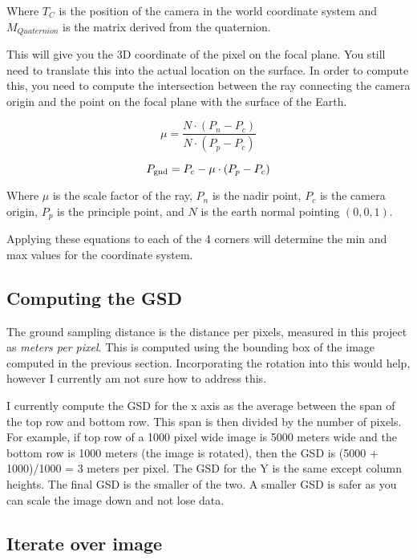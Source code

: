 Where $T_{C}$ is the position of the camera in the world coordinate system and
$M_{Quaternion}$ is the matrix derived from the quaternion. 

This will give you the 3D coordinate of the pixel on the focal plane.  You still need
to translate this into the actual location on the surface.  In order to compute this, you
need to compute the intersection between the ray connecting the camera origin and the 
point on the focal plane with the surface of the Earth.

\begin{equation}
\mu = \frac{N \cdot \left(P_n - P_c\right) }{N \cdot \left(P_p - P_c\right)}
\end{equation}

\begin{equation}
P_{\textup{gnd}} = P_c - \mu \cdot \left( P_{p} - P_{c} \right)
\end{equation}

Where $\mu$ is the scale factor of the ray, $P_n$ is the nadir point, $P_c$ is the camera origin, 
$P_p$ is the principle point, and $N$ is the earth normal pointing $\left( 0, 0, 1\right)$.
 
 
Applying these equations to each of the 4 corners will determine the min and max values for the 
coordinate system. 

\subsection*{Computing the GSD}

The ground sampling distance is the distance per pixels, measured in this project as \emph{meters per pixel}.
This is computed using the bounding box of the image computed in the previous section.  Incorporating the 
rotation into this would help, however I currently am not sure how to address this. 

I currently compute the GSD for the x axis as the average between the span of the top row and bottom row. 
This span is then divided by the number of pixels.  For example, if top row of a 1000 pixel wide image is 5000 meters wide and the bottom
row is 1000 meters (the image is rotated), then the GSD is (5000 + 1000)/1000 = 3 meters per pixel.  The 
GSD for the Y is the same except column heights. The final GSD is the smaller of the two.  A smaller GSD is safer as you can 
scale the image down and not lose data. 

 
\subsection*{Iterate over image}


